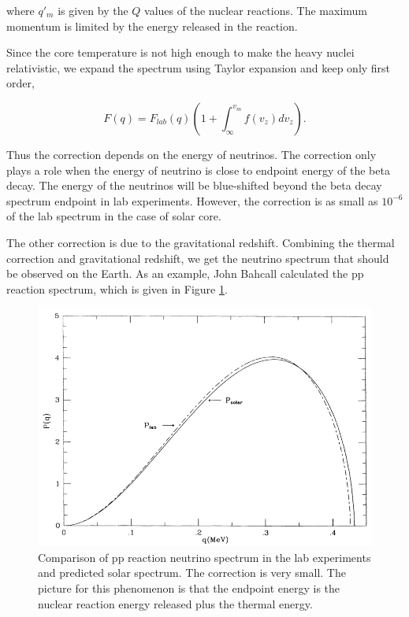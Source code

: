where $q'_m$ is given by the $Q$ values of the nuclear reactions. The maximum momentum is limited by the energy released in the reaction.

Since the core temperature is not high enough to make the heavy nuclei relativistic, we expand the spectrum using Taylor expansion and keep only first order,

\begin{equation}
F(q) = F_{lab}(q) (1 + \int_{\infty}^{v_m} f(v_z) dv_z).
\end{equation}

Thus the correction depends on the energy of neutrinos. The correction only plays a role when the energy of neutrino is close to endpoint energy of the beta decay. The energy of the neutrinos will be blue-shifted beyond the beta decay spectrum endpoint in lab experiments. However, the correction is as small as $10^{-6}$ of the lab spectrum in the case of solar core.\cite{Bahcall1991}

The other correction is due to the gravitational redshift. Combining the thermal correction and gravitational redshift, we get the neutrino spectrum that should be observed on the Earth. As an example, John Bahcall calculated the pp reaction spectrum, which is given in Figure \ref{fig:bahcall_pp_nu_spectrum}.


\begin{figure}
\centering
\includegraphics[width=\columnwidth]{chapters/assets/solar/bahcall_pp_nu_spectrum.png}
\caption{Comparison of pp reaction neutrino spectrum in the lab experiments and predicted solar spectrum.\cite{Bahcall1991} The correction is very small. The picture for this phenomenon is that the endpoint energy is the nuclear reaction energy released plus the thermal energy.}
\label{fig:bahcall_pp_nu_spectrum}
\end{figure}

